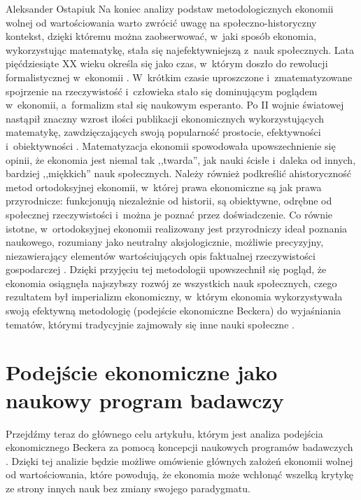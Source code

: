 \begin{artplenv}{Aleksander Ostapiuk}
Na koniec analizy podstaw metodologicznych ekonomii wolnej od wartościowania warto zwrócić uwagę na
społeczno-historyczny kontekst, dzięki któremu można zaobserwować, w~jaki sposób ekonomia, wykorzystując matematykę,
stała się najefektywniejszą z~nauk społecznych. Lata pięćdziesiąte XX wieku określa się jako czas, w~którym doszło do rewolucji
formalistycznej w~ekonomii
\parencite{blaug_formalist_2003}.
W~krótkim czasie uproszczone i~zmatematyzowane
spojrzenie na rzeczywistość i~człowieka stało się dominującym poglądem w~ekonomii, a~formalizm stał się naukowym
esperanto. Po II wojnie światowej nastąpił znaczny wzrost ilości publikacji ekonomicznych wykorzystujących matematykę,
zawdzięczających swoją popularność prostocie, efektywności i~obiektywności
\parencite{debreu_mathematization_1991}.
Matematyzacja ekonomii spowodowała upowszechnienie się opinii, że ekonomia jest niemal tak ,,twarda'', jak nauki
ścisłe i~daleka od innych, bardziej ,,miękkich'' nauk społecznych.
Należy również podkreślić ahistoryczność metod ortodoksyjnej
ekonomii, w~której prawa ekonomiczne są jak prawa przyrodnicze: funkcjonują niezależnie od historii, są obiektywne,
odrębne od społecznej rzeczywistości i~można je poznać przez doświadczenie. Co równie istotne, w~ortodoksyjnej ekonomii
realizowany jest przyrodniczy ideał poznania naukowego, rozumiany jako neutralny aksjologicznie, możliwie precyzyjny,
niezawierający elementów wartościujących opis faktualnej rzeczywistości gospodarczej
\parencite[zob.][]{zboron_dyskurs_2013}.
Dzięki przyjęciu tej metodologii upowszechnił się pogląd, że ekonomia osiągnęła najszybszy rozwój ze
wszystkich nauk społecznych, czego rezultatem był imperializm ekonomiczny, w~którym ekonomia wykorzystywała swoją
efektywną metodologię (podejście ekonomiczne Beckera) do wyjaśniania tematów, którymi tradycyjnie zajmowały się inne nauki
społeczne
\parencite{lazear_economic_2000,maki_economics_2009,maki_scientific_2017}.

\section{Podejście ekonomiczne jako naukowy program badawczy}
Przejdźmy teraz do głównego celu artykułu, którym jest analiza podejścia ekonomicznego Beckera za pomocą koncepcji
naukowych programów badawczych
\parencite{lakatos_methodology_1980}.
Dzięki tej analizie będzie możliwe omówienie
głównych założeń ekonomii wolnej od wartościowania, które powodują, że ekonomia może wchłonąć wszelką krytykę ze strony
innych nauk bez zmiany swojego paradygmatu. 


\end{artplenv}
